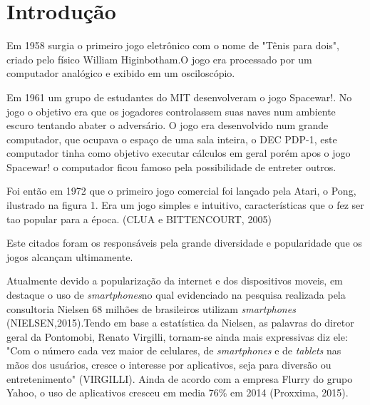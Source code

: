 \chapter{Introdução}
\label{cap:introducao}
 
 
Em 1958 surgia o primeiro jogo eletrônico com o nome de "Tênis para dois", criado pelo físico William Higinbotham.O jogo era processado por um computador analógico e exibido em um osciloscópio.


Em 1961 um grupo de estudantes do MIT desenvolveram o jogo Spacewar!. No jogo o objetivo era que os jogadores controlassem suas naves num ambiente escuro tentando abater o adversário. O jogo era desenvolvido num grande computador, que ocupava o espaço de uma sala inteira, o DEC PDP-1, este computador tinha como objetivo executar cálculos em geral porém apos o jogo Spacewar! o computador ficou famoso pela possibilidade de entreter outros.


Foi então em 1972 que o primeiro jogo comercial foi lançado pela Atari, o Pong, ilustrado na figura 1. Era um jogo simples e intuitivo, características que o fez ser tao popular para a época. (CLUA e BITTENCOURT, 2005) 

\begin{figure}[h!]
		\centering
	\end{figure}


Este citados foram os responsáveis pela grande diversidade e popularidade que os jogos alcançam ultimamente.

Atualmente devido a popularização da internet e dos dispositivos moveis, em destaque o uso de \textit{smartphones}no qual evidenciado na pesquisa realizada pela consultoria Nielsen 68 milhões de brasileiros utilizam \textit{smartphones} (NIELSEN,2015).Tendo em base a estatística da Nielsen, as palavras do diretor geral da Pontomobi, Renato Virgilli, tornam-se ainda mais expressivas diz ele: "Com o número cada vez maior de celulares, de \textit{smartphones} e de \textit{tablets} nas mãos dos usuários, cresce o interesse por aplicativos, seja para diversão ou entretenimento" (VIRGILLI).
Ainda de acordo com a empresa Flurry do grupo Yahoo, o uso de aplicativos cresceu em media 76\% em 2014 (Proxxima, 2015).
	
